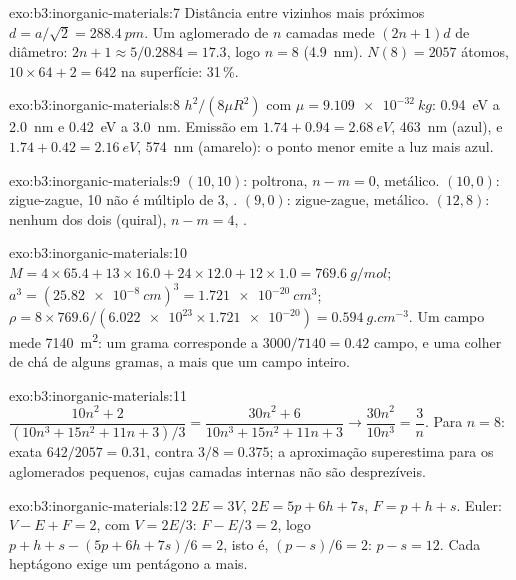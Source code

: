 \begin{solution}{exo:b3:inorganic-materials:7}
Distância entre vizinhos mais próximos $d = a/\sqrt2 = \qty{288.4}{pm}$. Um aglomerado de $n$ camadas mede $(2n + 1)d$ de diâmetro:
$2n + 1 \approx 5/0.2884 = 17.3$, logo $n = 8$ (\qty{4.9}{nm}). $N(8) = 2057$ átomos, $10 \times 64 + 2 = 642$ na superfície:
31\,\%.
\end{solution}

\begin{solution}{exo:b3:inorganic-materials:8}
$h^2/(8\mu R^2)$ com $\mu = \qty{9.109e-32}{kg}$: \qty{0.94}{eV} a \qty{2.0}{nm} e \qty{0.42}{eV} a \qty{3.0}{nm}. Emissão em
$1.74 + 0.94 = \qty{2.68}{eV}$, \qty{463}{nm} (azul), e $1.74 + 0.42 = \qty{2.16}{eV}$, \qty{574}{nm} (amarelo): o ponto menor
emite a luz mais azul.
\end{solution}

\begin{solution}{exo:b3:inorganic-materials:9}
$(10, 10)$: poltrona, $n - m = 0$, metálico. $(10, 0)$: zigue-zague, 10 não é múltiplo de 3, .
$(9, 0)$: zigue-zague, metálico. $(12, 8)$: nenhum dos dois (quiral), $n - m = 4$, .
\end{solution}

\begin{solution}{exo:b3:inorganic-materials:10}
$M = 4 \times 65.4 + 13 \times 16.0 + 24 \times 12.0 + 12 \times 1.0 = \qty{769.6}{g/mol}$; $a^3 = (\qty{25.82e-8}{cm})^3 = \qty{1.721e-20}{cm^3}$;
$\rho = 8 \times 769.6/(\num{6.022e23} \times \num{1.721e-20}) = \qty{0.594}{g.cm^{-3}}$. Um campo mede \qty{7140}{m^2}: um grama corresponde a
$3000/7140 = 0.42$ campo, e uma colher de chá de alguns gramas, a mais que um campo inteiro.
\end{solution}

\begin{solution}{exo:b3:inorganic-materials:11}
$\dfrac{10n^2 + 2}{(10n^3 + 15n^2 + 11n + 3)/3} = \dfrac{30n^2 + 6}{10n^3 + 15n^2 + 11n + 3} \to \dfrac{30n^2}{10n^3} = \dfrac3n$. Para $n = 8$: exata
$642/2057 = 0.31$, contra $3/8 = 0.375$; a aproximação superestima para os aglomerados
pequenos, cujas camadas internas não são desprezíveis.
\end{solution}

\begin{solution}{exo:b3:inorganic-materials:12}
$2E = 3V$, $2E = 5p + 6h + 7s$, $F = p + h + s$. Euler: $V - E + F = 2$, com $V = 2E/3$: $F - E/3 = 2$, logo
$p + h + s - (5p + 6h + 7s)/6 = 2$, isto é, $(p - s)/6 = 2$: $p - s = 12$. Cada heptágono exige um pentágono
a mais.
\end{solution}

